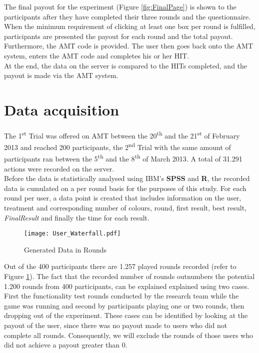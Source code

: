 The final payout for the experiment (Figure \ref{fig:FinalPage}) is shown to the participants after they have completed their three rounds and the questionnaire. \\
When the minimum requirement of clicking at least one box per round is fulfilled, participants are presented the payout for each round and the total payout. Furthermore, the \ac{AMT} code is provided.
The user then goes back onto the \ac{AMT} system, enters the \ac{AMT} code and completes his or her \ac{HIT}.\\
At the end, the data on the server is compared to the \ac{HIT}s completed, and the payout is made via the \ac{AMT} system.

\section{Data acquisition}
\label{ch:Experiment:sec:DataacquisitionDescriptives}
The 1\textsuperscript{st} Trial was offered on \ac{AMT} between the 20\textsuperscript{th} and the 21\textsuperscript{st} of February 2013 and reached 200 participants, the 2\textsuperscript{nd} Trial with the same amount of participants ran between the 5\textsuperscript{th} and the 8\textsuperscript{th} of March 2013. A total of 31.291 actions were recorded on the server.\\
Before the data is statistically analysed using IBM's \textbf{SPSS} and \textbf{R}, the recorded data is cumulated on a per round basis for the purposes of this study. For each round per user, a data point is created that includes information on the user, treatment and corresponding number of colours, round, first result, best result, \textit{FinalResult} and finally the time for each result.
 \begin{figure}[htp] %
\begin{center} %
  \texttt{[image: User\_Waterfall.pdf]}
  \caption{Generated Data in Rounds}
  \label{Data}
\end{center}
\end{figure}
Out of the 400 participants there are 1.257 played rounds recorded (refer to Figure \ref{Data}). The fact that the recorded number of rounds outnumbers the potential 1.200 rounds from 400 participants, can be explained explained using two cases. First the functionality test rounds conducted by the research team while the game was running and second by participants playing one or two rounds, then dropping out of the experiment. These cases can be identified by looking at the payout of the user, since there was no payout made to users who did not complete all rounds. Consequently, we will exclude the rounds of those users who did not achieve a payout greater than 0.\\

